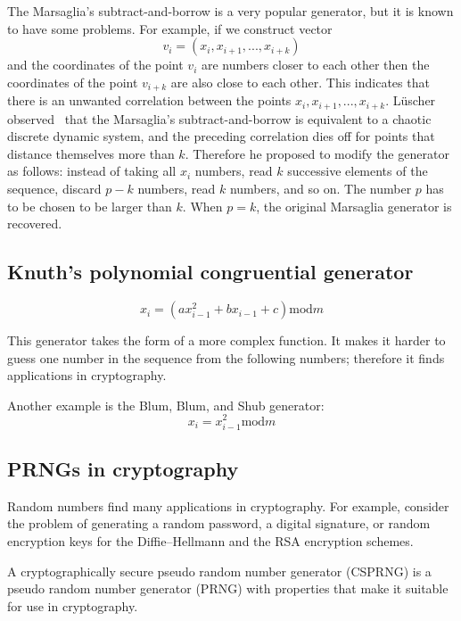 \documentclass[justified, sixbynine]{tufte-book}
\theoremstyle{plain}%
\newtheorem * {corollary}{Corollary}
\theoremstyle{definition}
\theoremstyle{remark}
\newtheorem * {remark}{Remark}
\newtheorem * {note}{Note}
\begin{document}
\begin{fullwidth}
The Marsaglia's subtract-and-borrow is a very popular generator, but it is known
to have some problems. For example, if we construct vector
\begin{equation}
v_i=(x_i, x_{i+1}, ..., x_{i+k})
\end{equation}
and the coordinates of the point $v_i$ are numbers closer to each other then
the coordinates of the point $v_{i+k}$ are also close to each other. This
indicates that there is an unwanted correlation between the points $%
x_i, x_{i+1}, ..., x_{i+k}$. L\"uscher observed~\cite{lusher} that the Marsaglia's
subtract-and-borrow is equivalent to a chaotic discrete dynamic system, and
the preceding correlation dies off for points that distance themselves more than $k$. Therefore
he proposed to modify the generator as follows: instead of taking all $x_i$
numbers, read $k$ successive elements of the sequence, discard $p-k$
numbers, read $k$ numbers, and so on. The number $p$ has to be chosen to be
larger than $k$. When $p=k$, the original Marsaglia generator is recovered.

\goodbreak\subsection{Knuth's polynomial congruential generator}

\begin{equation}
x_i=(ax_{i-1}^2+bx_{i-1}+c)\textrm{mod}m
\end{equation}

This generator takes the form of a more complex function. It makes it harder to guess one number in the sequence from the following numbers; therefore
it finds applications in cryptography.

Another example is the Blum, Blum, and Shub generator:
\begin{equation}
x_i=x_{i-1}^2\textrm{mod}m
\end{equation}

\goodbreak\subsection{PRNGs in cryptography}

Random numbers find many applications in cryptography. For example, consider
the problem of generating a random password, a digital signature, or random
encryption keys for the Diffie--Hellmann and the RSA encryption schemes.

A cryptographically secure pseudo random number generator (CSPRNG) is a
pseudo random number generator (PRNG) with properties that make it suitable
for use in cryptography.


\end{fullwidth}
\end{document}
